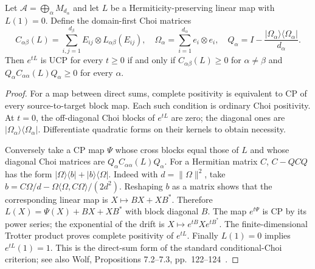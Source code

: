 \begin{lemma}\label{lem:p2-ccp}
Let $\mathcal A=\bigoplus_\alpha M_{d_\alpha}$ and let $L$ be a
Hermiticity-preserving linear map with $L(1)=0$. Define the domain-first
Choi matrices
\[
 C_{\alpha\beta}(L)=\sum_{i,j=1}^{d_\beta}
 E_{ij}\otimes L_{\alpha\beta}(E_{ij}),\quad
 \Omega_\alpha=\sum_{i=1}^{d_\alpha}e_i\otimes e_i,\quad
 Q_\alpha=I-\frac{|\Omega_\alpha\rangle\langle\Omega_\alpha|}{d_\alpha}.
\]
Then $e^{tL}$ is UCP for every $t\geq0$ if and only if
$C_{\alpha\beta}(L)\geq0$ for $\alpha\ne\beta$ and
$Q_\alpha C_{\alpha\alpha}(L)Q_\alpha\geq0$ for every $\alpha$.
\end{lemma}
\begin{proof}
For a map between direct sums, complete positivity is equivalent to CP
of every source-to-target block map. Each such condition is ordinary
Choi positivity. At $t=0$, the off-diagonal Choi blocks of $e^{tL}$ are
zero; the diagonal ones are $|\Omega_\alpha\rangle\langle\Omega_\alpha|$.
Differentiate quadratic forms on their kernels to obtain necessity.

Conversely take a CP map $\Psi$ whose cross blocks equal those of $L$
and whose diagonal Choi matrices are $Q_\alpha C_{\alpha\alpha}(L)Q_\alpha$.
For a Hermitian matrix $C$, $C-QCQ$ has the form
$|\Omega\rangle\langle b|+|b\rangle\langle\Omega|$.
Indeed with $d=\|\Omega\|^2$, take
$b=C\Omega/d-\Omega\langle\Omega,C\Omega\rangle/(2d^2)$.
Reshaping $b$ as a matrix shows that the corresponding linear map is
$X\mapsto BX+XB^*$. Therefore
$L(X)=\Psi(X)+BX+XB^*$ with block diagonal $B$.
The map $e^{t\Psi}$ is CP by its power series; the exponential of the
drift is $X\mapsto e^{tB}Xe^{tB^*}$. The finite-dimensional Trotter
product proves complete positivity of $e^{tL}$.
Finally $L(1)=0$ implies $e^{tL}(1)=1$. This is the direct-sum form of
the standard conditional-Choi criterion; see also Wolf,
Propositions 7.2--7.3, pp.~122--124~\cite{Wolf2012}.
\end{proof}

